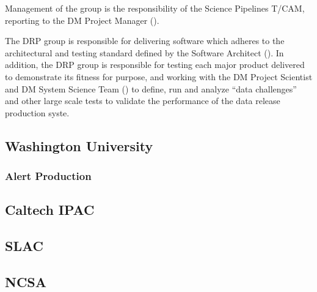 Management of the group is the responsibility of the Science Pipelines T/CAM, reporting to the DM Project Manager ().

The DRP group is responsible for delivering software which adheres to the architectural and testing standard defined by the Software Architect ().
In addition, the DRP group is responsible for testing each major product delivered to demonstrate its fitness for purpose, and working with the DM Project Scientist and DM System Science Team () to define, run and analyze ``data challenges'' and other large scale tests to validate the performance of the data release production syste.

\subsection {Washington University}\label{sect:uw}

\subsubsection{Alert Production \label{sect:ap}}

\subsection {Caltech IPAC}\label{sect:ipac}
\subsection {SLAC}\label{sect:slac}
\subsection {NCSA}\label{sect:ncsa}

